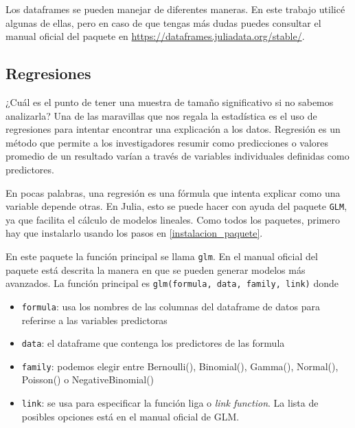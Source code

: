 Los dataframes se pueden manejar de diferentes maneras. En este trabajo utilicé algunas de ellas, pero en caso de que tengas más dudas puedes consultar el manual oficial del paquete en \url{https://dataframes.juliadata.org/stable/}. 

\subsection{Regresiones}


¿Cuál es el punto de tener una muestra de tamaño significativo si no sabemos analizarla? Una de las maravillas que nos regala la estadística es el uso de regresiones para intentar encontrar una explicación a los datos. Regresión es un método que permite a los investigadores resumir como predicciones o valores promedio de un resultado varían a través de variables individuales definidas como predictores. \citep{regression_other_stories} 

En pocas palabras, una regresión es una fórmula que intenta explicar como una variable depende otras. En Julia, esto se puede hacer con ayuda del paquete \texttt{GLM}, ya que facilita el cálculo de modelos lineales. Como todos los paquetes, primero hay que instalarlo usando los pasos en \ref{instalacion_paquete}. 

En este paquete la función principal se llama \texttt{glm}. En el manual oficial del paquete \cite{glm_manual} está descrita la manera en que se pueden generar modelos más avanzados. La función principal es \texttt{glm(formula, data, family, link)} donde 

\begin{itemize}
    \item \texttt{formula}: usa los nombres de las columnas del dataframe de datos para referirse a las variables predictoras
    
    \item \texttt{data}: el dataframe que contenga los predictores de las formula
    
    \item \texttt{family}: podemos elegir entre Bernoulli(), Binomial(), Gamma(), Normal(), Poisson() o NegativeBinomial() 
    
    \item \texttt{link}: se usa para especificar la función liga o \textit{link function}. La lista de posibles opciones está en el manual oficial de GLM. 
\end{itemize}


